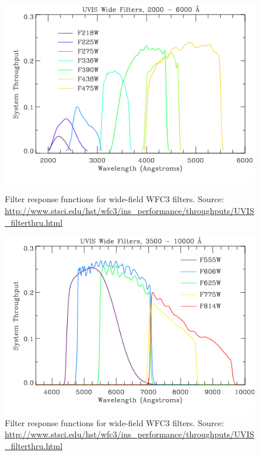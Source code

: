 \documentclass[12pt, a4paper]{report}
\begin{document}
\begin{figure}[h]
\begin{center}
\includegraphics[scale=0.5]{UVIS_Wide1.jpg}
\caption{Filter response functions for wide-field WFC3 filters. Source: \protect\url{http://www.stsci.edu/hst/wfc3/ins_performance/throughputs/UVIS_filterthru.html}}
\label{WFC3_response_funcs1}

\includegraphics[scale=0.5]{UVIS_Wide2.jpg}
\caption{Filter response functions for wide-field WFC3 filters. Source: \protect\url{http://www.stsci.edu/hst/wfc3/ins_performance/throughputs/UVIS_filterthru.html}}
\label{WFC3_response_funcs2}


\end{center}
\end{figure}
\end{document}
